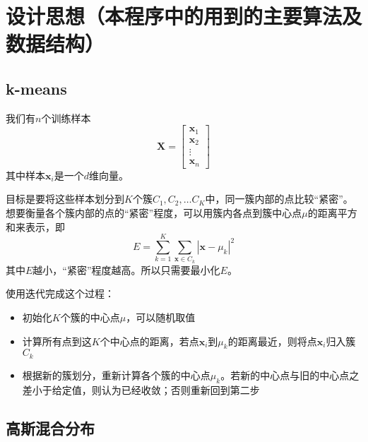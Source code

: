 \section{设计思想（本程序中的用到的主要算法及数据结构）}

\def\gauss{\mathcal{N}\left(\mathbf{x}_i|\mu_k,\Sigma_k\right)}

\def\sumk{\sum\limits^K_{k=1}}

\def\sumn{\sum\limits^n_{i=1}}

\def\gammaz#1{\gamma\left(\mathbf{z}_{i {#1}}\right)}


\subsection{k-means}

我们有$n$个训练样本
\begin{equation}
    \mathbf{X}=
    \begin{bmatrix}
        \mathbf{x}_1 \\ \mathbf{x}_2 \\ \vdots \\ \mathbf{x}_n
    \end{bmatrix}
\end{equation}
其中样本$\mathbf{x}_i$是一个$d$维向量。

目标是要将这些样本划分到$K$个簇$C_1, C_2, \ldots C_K$中，同一簇内部的点比较“紧密”。想要衡量各个簇内部的点的“紧密”程度，可以用簇内各点到簇中心点$\mu$的距离平方和来表示，即
\begin{equation}
    E=\sumk\sum_{\mathbf{x}\in C_k}|\mathbf{x}-\mu_k|^2
\end{equation}
其中$E$越小，“紧密”程度越高。所以只需要最小化$E$。

使用迭代完成这个过程：
\begin{itemize}
    \item 初始化$K$个簇的中心点$\mu$，可以随机取值
    \item 计算所有点到这$K$个中心点的距离，若点$\mathbf{x}_i$到$\mu_k$的距离最近，则将点$\mathbf{x}_i$归入簇$C_k$
    \item 根据新的簇划分，重新计算各个簇的中心点$\mu_k$。若新的中心点与旧的中心点之差小于给定值，则认为已经收敛；否则重新回到第二步
\end{itemize}

\subsection{高斯混合分布}

